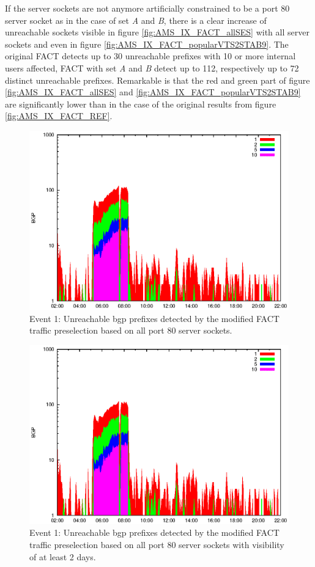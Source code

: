 If the \glspl{server socket} are not anymore artificially constrained to be a port 80 \gls{server socket} as in the case of set \emph{A} and \emph{B}, there is a clear increase of unreachable sockets visible in figure \ref{fig:AMS_IX_FACT_allSES} with all server sockets and even in figure \ref{fig:AMS_IX_FACT_popularVTS2STAB9}. 
The original \gls{FACT} detects up to 30 unreachable prefixes with 10 or more internal users affected, \gls{FACT} with set \emph{A} and \emph{B} detect up to 112, respectively up to 72 distinct unreachable prefixes. 
Remarkable is that the red and green part of figure \ref{fig:AMS_IX_FACT_allSES} and \ref{fig:AMS_IX_FACT_popularVTS2STAB9} are significantly lower than in the case of the original results from figure \ref{fig:AMS_IX_FACT_REF}. 
\begin{figure}
	[p] \centering 
	\includegraphics[width=0.75\linewidth]{images/events/2010_03_25/bgp_log_allPort80SES.eps} \caption{Event 1: Unreachable \gls{bgp} prefixes detected by the modified \gls{FACT} traffic preselection based on all port 80 \glspl{server socket}.} 
	\label{fig:AMS_IX_FACT_allSES80} 
\end{figure}
\begin{figure}
	[p] \centering 
	\includegraphics[width=0.75\linewidth]{images/events/2010_03_25/bgp_log_port80_Set_stab_0_vts_2.eps} \caption{Event 1: Unreachable \gls{bgp} prefixes detected by the modified \gls{FACT} traffic preselection based on all port 80 \glspl{server socket} with visibility of at least 2 days.} 
	\label{fig:AMS_IX_FACT_allSES80VTS2} 
\end{figure}
